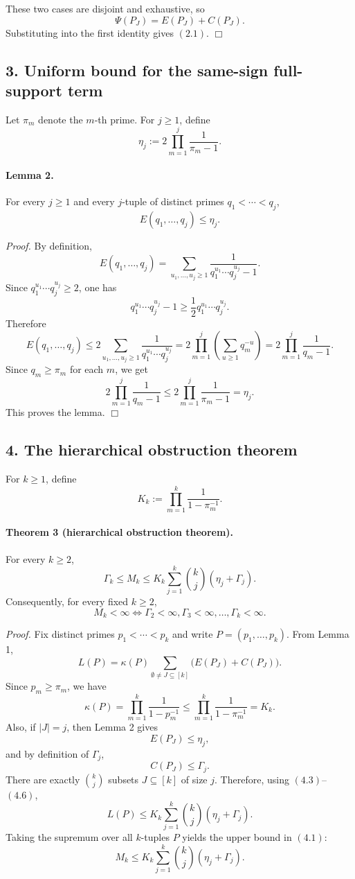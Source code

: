 These two cases are disjoint and exhaustive, so
\[
\Psi(P_J)=E(P_J)+C(P_J).
\]
Substituting into the first identity gives \((2.1)\).
\hfill\(\Box\)

\subsection*{3. Uniform bound for the same-sign full-support term}

Let \(\pi_m\) denote the \(m\)-th prime. For \(j\ge 1\), define
\[
\eta_j:=2\prod_{m=1}^{j}\frac{1}{\pi_m-1}.
\]

\paragraph{Lemma 2.}
For every \(j\ge 1\) and every \(j\)-tuple of distinct primes \(q_1<\cdots<q_j\),
\[
E(q_1,\dots,q_j)\le \eta_j.
\]

\emph{Proof.}
By definition,
\[
E(q_1,\dots,q_j)=
\sum_{u_1,\dots,u_j\ge 1}
\frac{1}{q_1^{u_1}\cdots q_j^{u_j}-1}.
\]
Since \(q_1^{u_1}\cdots q_j^{u_j}\ge 2\), one has
\[
q_1^{u_1}\cdots q_j^{u_j}-1\ge \frac12 q_1^{u_1}\cdots q_j^{u_j}.
\]
Therefore
\[
E(q_1,\dots,q_j)
\le
2\sum_{u_1,\dots,u_j\ge 1}\frac{1}{q_1^{u_1}\cdots q_j^{u_j}}
=
2\prod_{m=1}^{j}\left(\sum_{u\ge 1}q_m^{-u}\right)
=
2\prod_{m=1}^{j}\frac{1}{q_m-1}.
\]
Since \(q_m\ge \pi_m\) for each \(m\), we get
\[
2\prod_{m=1}^{j}\frac{1}{q_m-1}
\le
2\prod_{m=1}^{j}\frac{1}{\pi_m-1}
=
\eta_j.
\]
This proves the lemma.
\hfill\(\Box\)

\subsection*{4. The hierarchical obstruction theorem}

For \(k\ge 1\), define
\[
K_k:=\prod_{m=1}^{k}\frac{1}{1-\pi_m^{-1}}.
\]

\paragraph{Theorem 3 (hierarchical obstruction theorem).}
For every \(k\ge 2\),
\[
\Gamma_k\le M_k\le K_k\sum_{j=1}^{k}\binom{k}{j}(\eta_j+\Gamma_j).
\tag{4.1}
\]
Consequently, for every fixed \(k\ge 2\),
\[
M_k<\infty
\iff
\Gamma_2<\infty,\Gamma_3<\infty,\dots,\Gamma_k<\infty.
\tag{4.2}
\]

\emph{Proof.}
Fix distinct primes \(p_1<\cdots<p_k\) and write \(P=(p_1,\dots,p_k)\).
From Lemma 1,
\[
L(P)=\kappa(P)\sum_{\emptyset\neq J\subseteq [k]}\bigl(E(P_J)+C(P_J)\bigr).
\tag{4.3}
\]
Since \(p_m\ge \pi_m\), we have
\[
\kappa(P)=\prod_{m=1}^{k}\frac{1}{1-p_m^{-1}}
\le
\prod_{m=1}^{k}\frac{1}{1-\pi_m^{-1}}
=K_k.
\tag{4.4}
\]
Also, if \(|J|=j\), then Lemma 2 gives
\[
E(P_J)\le \eta_j,
\tag{4.5}
\]
and by definition of \(\Gamma_j\),
\[
C(P_J)\le \Gamma_j.
\tag{4.6}
\]
There are exactly \(\binom{k}{j}\) subsets \(J\subseteq [k]\) of size \(j\). Therefore, using \((4.3)\)--\((4.6)\),
\[
L(P)
\le
K_k\sum_{j=1}^{k}\binom{k}{j}(\eta_j+\Gamma_j).
\]
Taking the supremum over all \(k\)-tuples \(P\) yields the upper bound in \((4.1)\):
\[
M_k\le K_k\sum_{j=1}^{k}\binom{k}{j}(\eta_j+\Gamma_j).
\]

